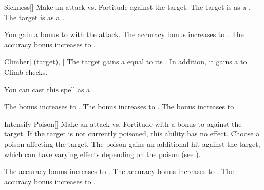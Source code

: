 \lowercase{\hypertarget{spell:Sickness}{}}\label{spell:Sickness}
\begin{freeability}[Rank 1]{\hypertarget{spell:Sickness}{Sickness}}[]
Make an attack vs. Fortitude against the target.
\hit The target is  as a .
\crit The target is  as a .

\rankline
{} You gain a  bonus to  with the attack.
 The accuracy bonus increases to .
 The accuracy bonus increases to .
\end{freeability}
\vspace{0.25em}



\lowercase{\hypertarget{spell:Climber}{}}\label{spell:Climber}
\begin{attuneability}[Rank 2]{\hypertarget{spell:Climber}{Climber}}[ (target), ]
The target gains a  equal to its .
In addition, it gains a   to Climb checks.

You can cast this spell as a .

\rankline
{} The bonus increases to .
 The bonus increases to .
 The bonus increases to .
\end{attuneability}
\vspace{0.25em}



\lowercase{\hypertarget{spell:Intensify Poison}{}}\label{spell:Intensify Poison}
\begin{freeability}[Rank 2]{\hypertarget{spell:Intensify Poison}{Intensify Poison}}[]
Make an attack vs. Fortitude with a  bonus to  against the target.
If the target is not currently poisoned, this ability has no effect.
\hit Choose a poison affecting the target.
The poison gains an additional hit against the target, which can have varying effects depending on the poison (see ).

\rankline
{} The accuracy bonus increases to .
 The accuracy bonus increases to .
 The accuracy bonus increases to .
\end{freeability}
\vspace{0.25em}



